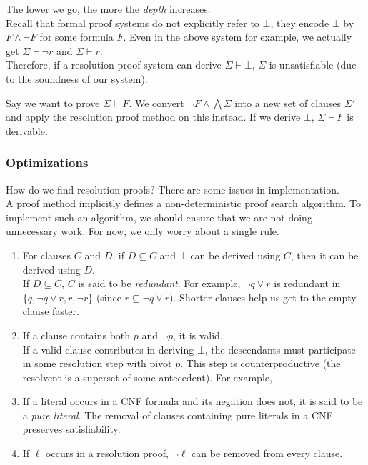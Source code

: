 The lower we go, the more the \textit{depth} increases.\\
Recall that formal proof systems do not explicitly refer to $\bot$, they encode $\bot$ by $F\land\neg F$ for some formula $F$. Even in the above system for example, we actually get $\Sigma\vdash\neg r$ and $\Sigma\vdash r$.\\
Therefore, if a resolution proof system can derive $\Sigma\vdash\bot$, $\Sigma$ is unsatisfiable (due to the soundness of our system).

Say we want to prove $\Sigma\vdash F$. We convert $\neg F\wedge\bigwedge\Sigma$ into a new set of clauses $\Sigma'$ and apply the resolution proof method on this instead. If we derive $\bot$, $\Sigma\vdash F$ is derivable.

\subsubsection{Optimizations}

How do we find resolution proofs? There are some issues in implementation.\\
A proof method implicitly defines a non-deterministic proof search algorithm. To implement such an algorithm, we should ensure that we are not doing unnecessary work. For now, we only worry about a single rule.\\

\begin{enumerate}
	\item For clauses $C$ and $D$, if $D\subseteq C$ and $\bot$ can be derived using $C$, then it can be derived using $D$.\\
	If $D\subseteq C$, $C$ is said to be \textit{redundant}. For example, $\neg q\lor r$ is redundant in $\{q,\neg q\lor r, r, \neg r\}$ (since $r\subseteq \neg q\lor r$). Shorter clauses help us get to the empty clause faster.

	\item If a clause contains both $p$ and $\neg p$, it is valid.\\
	If a valid clause contributes in deriving $\bot$, the descendants must participate in some resolution step with pivot $p$. This step is counterproductive (the resolvent is a superset of some antecedent). For example,
	\begin{prooftree}
	\end{prooftree}
	
	\item If a literal occurs in a CNF formula and its negation does not, it is said to be a \textit{pure literal}. The removal of clauses containing pure literals in a CNF preserves satisfiability.

	\item If $\ell$ occurs in a resolution proof, $\neg\ell$ can be removed from every clause.
\end{enumerate}

